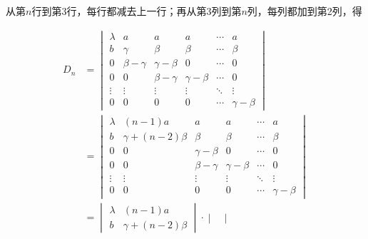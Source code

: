 \begin{enumerate}
        \begin{solution}
            从第$n$行到第3行，每行都减去上一行；再从第3列到第$n$列，每列都加到第2列，得

            \begin{align*}
                D_n & =
                \begin{vmatrix}
                    \lambda & a            & a            & a            & \cdots & a            \\
                    b       & \gamma       & \beta        & \beta        & \cdots & \beta        \\
                    0       & \beta-\gamma & \gamma-\beta & 0            & \cdots & 0            \\
                    0       & 0            & \beta-\gamma & \gamma-\beta & \cdots & 0            \\
                    \vdots  & \vdots       & \vdots       & \vdots       & \ddots & \vdots       \\
                    0       & 0            & 0            & 0            & \cdots & \gamma-\beta
                \end{vmatrix}             \\
                    & =\begin{vmatrix}
                           \lambda & (n-1)a            & a            & a            & \cdots & a            \\
                           b       & \gamma+(n-2)\beta & \beta        & \beta        & \cdots & \beta        \\
                           0       & 0                 & \gamma-\beta & 0            & \cdots & 0            \\
                           0       & 0                 & \beta-\gamma & \gamma-\beta & \cdots & 0            \\
                           \vdots  & \vdots            & \vdots       & \vdots       & \ddots & \vdots       \\
                           0       & 0                 & 0            & 0            & \cdots & \gamma-\beta
                       \end{vmatrix} \\
                    & =\begin{vmatrix}
                           \lambda & (n-1)a            \\
                           b       & \gamma+(n-2)\beta
                       \end{vmatrix} \cdot \begin{vmatrix}

\end{vmatrix}
\end{align*}
\end{solution}
\end{enumerate}
